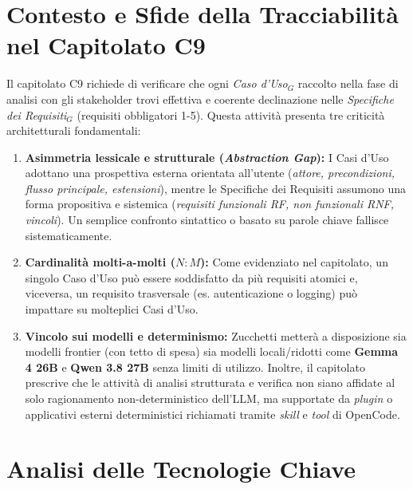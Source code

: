 \documentclass[a4paper, 11pt]{article}
\newcommand{\term}[1]{\textit{#1}$_G$} %
\begin{document}
\newpage
\section{Contesto e Sfide della Tracciabilità nel Capitolato C9}

Il capitolato C9 richiede di verificare che ogni \term{Caso d'Uso} raccolto nella fase di analisi con gli stakeholder trovi effettiva e coerente declinazione nelle \term{Specifiche dei Requisiti} (requisiti obbligatori 1-5). Questa attività presenta tre criticità architetturali fondamentali:

\begin{enumerate}
    \item \textbf{Asimmetria lessicale e strutturale (\textit{Abstraction Gap}):} I Casi d'Uso adottano una prospettiva esterna orientata all'utente (\textit{attore, precondizioni, flusso principale, estensioni}), mentre le Specifiche dei Requisiti assumono una forma propositiva e sistemica (\textit{requisiti funzionali RF, non funzionali RNF, vincoli}). Un semplice confronto sintattico o basato su parole chiave fallisce sistematicamente.
    \item \textbf{Cardinalità molti-a-molti ($N:M$):} Come evidenziato nel capitolato, un singolo Caso d'Uso può essere soddisfatto da più requisiti atomici e, viceversa, un requisito trasversale (es. autenticazione o logging) può impattare su molteplici Casi d'Uso.
    \item \textbf{Vincolo sui modelli e determinismo:} Zucchetti metterà a disposizione sia modelli frontier (con tetto di spesa) sia modelli locali/ridotti come \textbf{Gemma 4 26B} e \textbf{Qwen 3.8 27B} senza limiti di utilizzo. Inoltre, il capitolato prescrive che le attività di analisi strutturata e verifica non siano affidate al solo ragionamento non-deterministico dell'LLM, ma supportate da \textit{plugin} o applicativi esterni deterministici richiamati tramite \textit{skill} e \textit{tool} di OpenCode.
\end{enumerate}

\section{Analisi delle Tecnologie Chiave}
\end{document}

